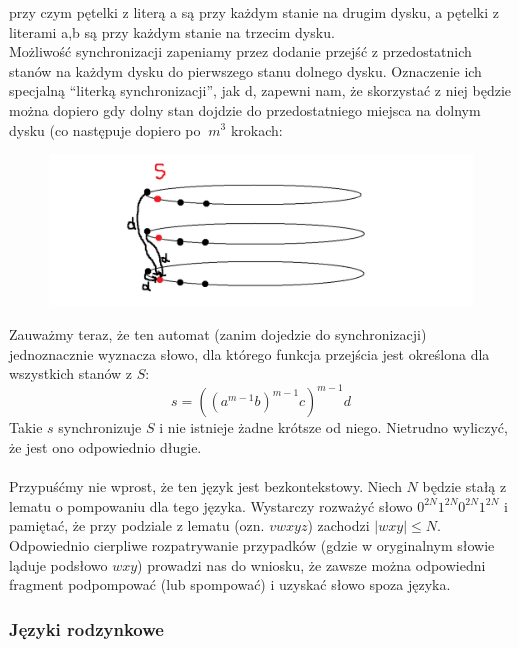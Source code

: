 \documentclass[a4paper,11pt]{article}
\newenvironment{zadanie}[1]
  {\renewcommand\theinnercustomthm{#1}\innercustomthm}
  {\endinnercustomthm}
\begin{document}
przy czym pętelki z literą a są przy każdym stanie na drugim dysku, a pętelki z literami a,b są przy każdym stanie na trzecim
dysku. \\
Możliwość synchronizacji zapeniamy przez dodanie przejść z przedostatnich stanów na każdym dysku do pierwszego stanu 
dolnego dysku. Oznaczenie ich specjalną ``literką synchronizacji'', jak d, zapewni nam, że skorzystać z niej będzie można
dopiero gdy dolny stan dojdzie do przedostatniego miejsca na dolnym dysku (co następuje dopiero po $~m^3$ krokach: \\
\begin{figure}[h!]
  \centerline{%
    \includegraphics[width=18cm]{zad42_3.png}%
  }%
\end{figure}

Zauważmy teraz, że ten automat (zanim dojedzie do synchronizacji) jednoznacznie wyznacza słowo, dla którego funkcja przejścia 
jest określona dla wszystkich stanów z $S$:
$$
s = ((a^{m-1}b)^{m-1}c)^{m-1}d
$$
Takie $s$ synchronizuje $S$ i nie istnieje żadne krótsze od niego. Nietrudno wyliczyć, że jest ono odpowiednio długie. \\ \\



\begin{zadanie}{63}
\end{zadanie}
Przypuśćmy nie wprost, że ten język jest bezkontekstowy. Niech $N$ będzie stałą z lematu o pompowaniu dla tego języka. 
Wystarczy rozważyć słowo $0^{2N}1^{2N}0^{2N}1^{2N}$ i pamiętać, że przy podziale z lematu (ozn. $vwxyz$) zachodzi
$|wxy| \leqslant N$. Odpowiednio cierpliwe rozpatrywanie przypadków (gdzie w oryginalnym słowie ląduje podsłowo $wxy$)
prowadzi nas do wniosku, że zawsze można odpowiedni fragment podpompować (lub spompować) i uzyskać słowo spoza języka.


\subsubsection{Języki rodzynkowe}
\end{document}
